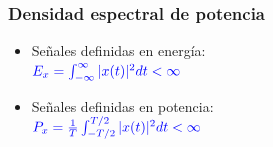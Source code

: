 \begin{frame}
  \frametitle{Densidad espectral de potencia}

  \begin{itemize}
    \begin{alertblock}{\centering Densidad espectral de Potencia}
      \vspace{0.2cm}
      \centering $\Phi_{xx}(\omega)=X(\omega)X^*(\omega)=|X(\omega)|^2$ \\ \vspace{0.2cm}
    \end{alertblock}
    \item {\small Señales definidas en energía: \\ \centering $\color{blue}E_x = \int_{-\infty}^{\infty}|x(t)|^2dt<\infty\color{blue}$}
    \item {\small Señales definidas en potencia: \\\centering $\color{blue}P_x = \frac{1}{T}\int_{-T/2}^{T/2}|x(t)|^2dt<\infty\color{blue}$}
    \end{itemize}
  
\end{frame}



